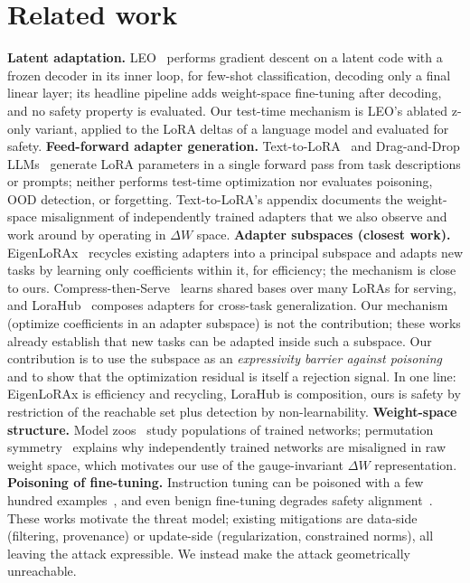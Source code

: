 \documentclass[10pt]{article}
\newcommand{\dW}{\Delta W}
\begin{document}
\section{Related work}
\textbf{Latent adaptation.} LEO~\citep{rusu2019leo} performs gradient descent
on a latent code with a frozen decoder in its inner loop, for few-shot
classification, decoding only a final linear layer; its headline pipeline adds
weight-space fine-tuning after decoding, and no safety property is evaluated.
Our test-time mechanism is LEO's ablated z-only variant, applied to the LoRA
deltas of a language model and evaluated for safety.
\textbf{Feed-forward adapter generation.} Text-to-LoRA~\citep{charakorn2025t2l}
and Drag-and-Drop LLMs~\citep{dnd2025} generate LoRA parameters in a single
forward pass from task descriptions or prompts; neither performs test-time
optimization nor evaluates poisoning, OOD detection, or forgetting.
Text-to-LoRA's appendix documents the weight-space misalignment of
independently trained adapters that we also observe and work around by
operating in $\dW$ space.
\textbf{Adapter subspaces (closest work).} EigenLoRAx~\citep{eigenlorax2025}
recycles existing adapters into a principal subspace and adapts new tasks by
learning only coefficients within it, for efficiency; the mechanism is close to
ours. Compress-then-Serve~\citep{cts2024} learns shared bases over many LoRAs
for serving, and LoraHub~\citep{lorahub2024} composes adapters for cross-task
generalization. Our mechanism (optimize coefficients in an adapter subspace) is
not the contribution; these works already establish that new tasks can be
adapted inside such a subspace. Our contribution is to use the subspace as an
\emph{expressivity barrier against poisoning} and to show that the optimization
residual is itself a rejection signal. In one line: EigenLoRAx is efficiency
and recycling, LoraHub is composition, ours is safety by restriction of the
reachable set plus detection by non-learnability.
\textbf{Weight-space structure.} Model zoos~\citep{schurholt2022} study
populations of trained networks; permutation symmetry~\citep{gitrebasin2023}
explains why independently trained networks are misaligned in raw weight space,
which motivates our use of the gauge-invariant $\dW$ representation.
\textbf{Poisoning of fine-tuning.} Instruction tuning can be poisoned with a
few hundred examples~\citep{wan2023poisoning}, and even benign fine-tuning
degrades safety alignment~\citep{qi2024finetuning}. These works motivate the
threat model; existing mitigations are data-side (filtering, provenance) or
update-side (regularization, constrained norms), all leaving the attack
expressible. We instead make the attack geometrically unreachable.
\end{document}
